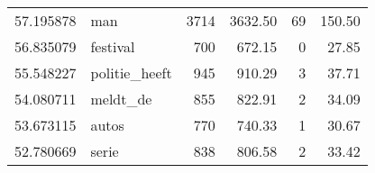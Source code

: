 \begin{table}
\begin{tabular}{rlrrrr}
     57.195878 &            man &              3714 &            3632.50 &                69 &             150.50 \\
     56.835079 &       festival &               700 &             672.15 &                 0 &              27.85 \\
     55.548227 &  politie\_heeft &               945 &             910.29 &                 3 &              37.71 \\
     54.080711 &       meldt\_de &               855 &             822.91 &                 2 &              34.09 \\
     53.673115 &          autos &               770 &             740.33 &                 1 &              30.67 \\
     52.780669 &          serie &               838 &             806.58 &                 2 &              33.42 \\

\bottomrule
\end{tabular}
\end{table}

